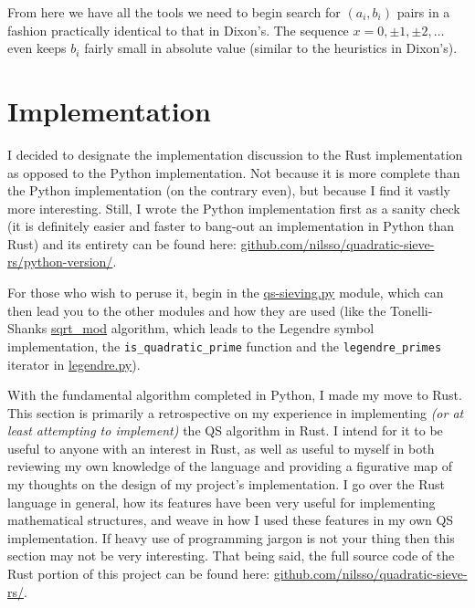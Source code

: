 \documentclass{report}
\begin{document}
From here we have all the tools we need to begin search for $(a_i,b_i)$ pairs in a fashion
practically identical to that in Dixon's. The sequence $x=0,\pm 1,\pm 2,\ldots$ even keeps $b_i$
fairly small in absolute value (similar to the heuristics in Dixon's).

\chapter{Implementation}

I decided to designate the implementation discussion to the Rust implementation
as opposed to the Python implementation. Not because it is more complete than
the Python implementation (on the contrary even), but because I find it vastly
more interesting. Still, I wrote the Python implementation first as a sanity
check (it is definitely easier and faster to bang-out an implementation in
Python than Rust) and its entirety can be found here:
\href{https://github.com/nilsso/quadratic-sieve-rs/tree/main/python-version}{github.com/nilsso/quadratic-sieve-rs/python-version/}.

For those who wish to peruse it, begin in the
\href{https://github.com/nilsso/quadratic-sieve-rs/blob/main/python-version/qs-sieving.py}{qs-sieving.py}
module, which can then lead you to the other modules and how they are used
(like the Tonelli-Shanks
\href{https://github.com/nilsso/quadratic-sieve-rs/blob/main/python-version/sqrt\_mod.py#L22}{sqrt\_mod}
algorithm, which leads to the Legendre symbol implementation, the \Verb+is_quadratic_prime+
function and the \Verb+legendre_primes+ iterator in
\href{https://github.com/nilsso/quadratic-sieve-rs/blob/main/python-version/legendre.py}{legendre.py}).

With the fundamental algorithm completed in Python, I made my move to Rust.
This section is primarily a retrospective on my experience in implementing \emph{(or at
least attempting to implement)} the QS algorithm in Rust. I intend for it to be useful to anyone
with an interest in Rust, as well as useful to myself in both reviewing my own knowledge of the
language and providing a figurative map of my thoughts on the design of my project's implementation.
I go over the Rust language in general, how its features have been very useful for implementing
mathematical structures, and weave in how I used these features in my own QS implementation. If
heavy use of programming jargon is not your thing then this section may not be very interesting.
That being said, the full source code of the Rust portion of this project can be found here:
\href{https://github.com/nilsso/quadratic-sieve-rs/tree/main/src}{github.com/nilsso/quadratic-sieve-rs/}.
\end{document}
